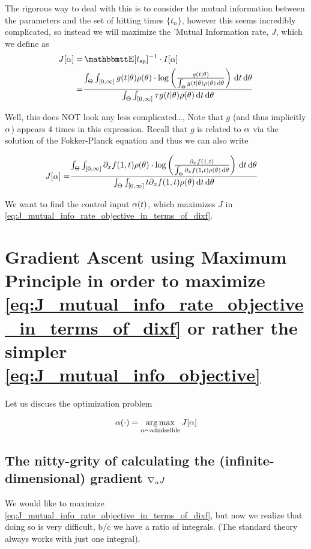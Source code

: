 The rigorous way to deal with this is to consider the mutual information between
the parameters and the set of hitting times $\{t_n\}$, however this seems
incredibly complicated, so instead we will maximize the 'Mutual Information
rate, $J$, which we define as 
\begin{align}
J[\a]= & \Exp[\ts]^{-1} \cdot I[\a]
\\
= & \frac{
\int_\Theta \int_{[0, \infty]} g(t|\th)  \rho(\th) \cdot 
\log \left( \frac{g(t|\th)}{\int_\Theta g(t|\th)\rho(\th) \intd{\th} } \right)
\intd{t}\intd{\th}}
{ \int_\Theta \int_{[0, \infty]} \t g(t|\th)\rho(\th) \intd{t}\intd{\th}}
\label{eq:J_mutual_info_rate_objective}
\end{align}

Well, this does NOT look any less complicated\ldots, Note that $g$ (and thus
implicitly $\alpha$) appears 4 times in this expression. Recall that $g$ is related
to $\alpha$ via the solution of the Fokker-Planck equation and thus we can also
write

\begin{align}
J[\alpha] 
= & \frac{
\int_\Theta \int_{[0, \infty]} {\partial}_xf(1, t)  \rho({ \theta}) \cdot 
\log \left( \frac{{\partial}_xf(1, t)}{\int_\Theta {\partial}_xf(1, t)\rho({ \theta}) \, \mathrm{d} { \theta} } \right)
\, \mathrm{d} t\, \mathrm{d} { \theta}}
{ \int_\Theta \int_{[0, \infty]} t {\partial}_xf(1, t)\rho({ \theta}) \, \mathrm{d} t\, \mathrm{d} { \theta}}
\label{eq:J_mutual_info_rate_objective_in_terms_of_dixf} 
\end{align}
  
We want to find the control input $\alpha(t)$, which maximizes $J$ in
\cref{eq:J_mutual_info_rate_objective_in_terms_of_dixf}. 

\section{Gradient Ascent using Maximum Principle in order to maximize 
\cref{eq:J_mutual_info_rate_objective_in_terms_of_dixf} or rather the simpler 
\cref{eq:J_mutual_info_objective}} 

Let us discuss the optimization problem

$$
\a(\cdot) = \argmax_{\a \sim \textrm{admissible}} J[\a]
$$ 
   

\subsection{The nitty-grity of calculating the (infinite-dimensional) gradient
${ \nabla }_{\alpha} J$ } We would like to maximize
\cref{eq:J_mutual_info_rate_objective_in_terms_of_dixf}, but now we realize that
doing so is very difficult, b/c we have a ratio of integrals. (The standard
theory always works with just one integral).

